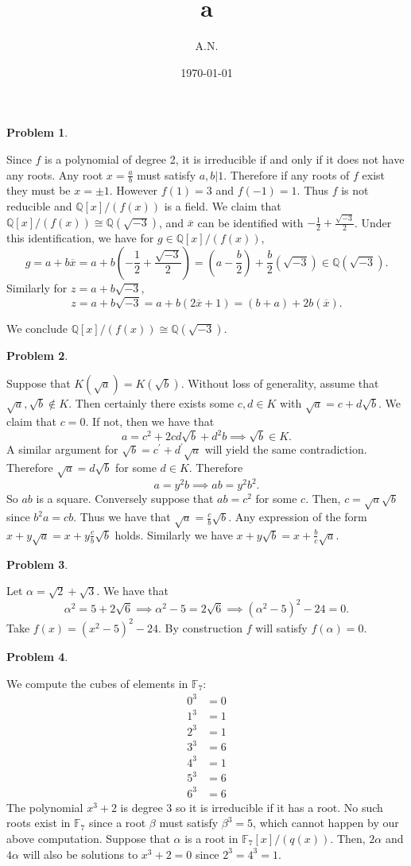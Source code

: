 \documentclass[12pt, a4paper]{article}
\title{a}
\author{A.N.}
\date{\today}
\newtheorem{problem}{Problem}
\theoremstyle{definition}
\newcommand{\F}{\mathbb{F}}                           %
\newcommand{\Q}{\mathbb{Q}}                           %
\newcommand{\ol}{\overline}
\begin{document}
	\begin{problem}
	\end{problem}
Since $f$ is a polynomial of degree 2, it is irreducible if and only if it does not have any roots. Any root $x = \frac{a}{b}$ must satisfy $a,b|1$. Therefore if any roots of $f$ exist they must be $x = \pm1$. However $f(1)=3$ and $f(-1) =1$. Thus $f$ is not reducible and $\Q[x]/ (f(x))$ is a field. We claim that $\Q[x]/ (f(x)) \cong \Q(\sqrt{-3})$, and $\ol{x}$ can be identified with $-\frac{1}{2} + \frac{\sqrt{-3}}{2}$. Under this identification, we have for $g\in \Q[x]/ (f(x))$, $$g = a+b\ol{x} = a+ b\left(-\frac{1}{2} + \frac{\sqrt{-3}}{2}\right)  = (a - \frac{b}{2}) + \frac{b}{2}(\sqrt{-3}) \in \Q(\sqrt{-3}). $$
Similarly for $z = a+b\sqrt{-3}$, 
$$z = a+b\sqrt{-3} = a+b(2\ol{x} +1) = (b+a) + 2b(\ol{x}).$$ 

We conclude $\Q[x]/ (f(x)) \cong \Q(\sqrt{-3})$. 
\newpage 
\begin{problem}
\end{problem}
Suppose that $K(\sqrt{a}) = K(\sqrt{b})$. Without loss of generality, assume that $\sqrt{a}, \sqrt{b} \not \in K$. Then certainly there exists some $c,d \in K$ with $\sqrt{a} = c+d\sqrt{b}. $ We claim that $c = 0$. If not, then we have that $$a = c^2+ 2cd\sqrt{b} + d^2b \implies \sqrt{b} \in K.$$ A similar argument for $\sqrt{b} = c^\prime + d^\prime \sqrt{a}$ will yield the same contradiction. Therefore $\sqrt{a} = d\sqrt{b}$ for some $d\in K$. Therefore $$a = y^2b \implies ab = y^2b^2.$$ So $ab$ is a square. Conversely suppose that $ab = c^2$ for some $c$. Then, $c = \sqrt{a}\sqrt{b}$ since $b^2a = cb$. Thus we have that $\sqrt{a} = \frac{c}{b}\sqrt{b}$. Any expression of the form $x+y\sqrt{a} = x+ y\frac{c}{b}\sqrt{b}$ holds. Similarly we have $x+y\sqrt{b} = x+ \frac{b}{c}\sqrt{a}$. 
\newpage
\begin{problem}
\end{problem}
Let $\alpha = \sqrt{2} + \sqrt{3}.$ We have that $$\alpha^2 = 5+ 2\sqrt{6} \implies \alpha^2 - 5 = 2\sqrt{6} \implies (\alpha^2 - 5)^2 - 24 =0.$$ Take $f(x) = (x^2-5)^2 - 24$. By construction $f$ will satisfy $f(\alpha) = 0$. 
\newpage 
\begin{problem}
\end{problem}
We compute the cubes of elements in $\F_7$: 
\begin{align*}
	0^3 & = 0
	\\ 1^3 & = 1
	\\ 2^3 & = 1
	\\ 3^3 & = 6
	\\ 4^3 & = 1
	\\ 5^3 & = 6
	\\ 6^3 & = 6
\end{align*}
The polynomial $x^3+2 $ is degree 3 so it is irreducible if it has a root. No such roots exist in $\F_7$ since a root $\beta$ must satisfy $\beta^3 = 5$, which cannot happen by our above computation. Suppose that $\alpha$ is a root in $\F_7[x]/ (q(x))$. Then, $2\alpha$ and $4\alpha$ will also be solutions to $x^3+2 =0$ since $2^3=4^3=1$. 
\end{document}
